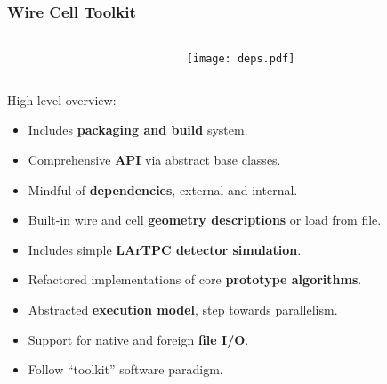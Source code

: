 \documentclass[xcolor=dvipsnames]{beamer}
\begin{document}
\begin{frame}
  \frametitle{Wire Cell Toolkit}
  \begin{columns}
    \begin{column}{0.65\paperwidth}
    \end{column}
    \begin{column}{0.35\paperwidth}
      \vspace{-20mm}
      \texttt{[image: deps.pdf]}      
    \end{column}
  \end{columns}

  \vspace{-15mm}

  High level overview:
  \begin{itemize}
  \item Includes \textbf{packaging and build} system.
  \item Comprehensive \textbf{API} via abstract base classes.
  \item Mindful of \textbf{dependencies}, external and internal.
  \item Built-in wire and cell \textbf{geometry descriptions} or load from file.
  \item Includes simple \textbf{LArTPC detector simulation}.
  \item Refactored implementations of core \textbf{prototype algorithms}.
  \item Abstracted \textbf{execution model}, step towards parallelism.
  \item Support for native and foreign \textbf{file I/O}.
  \item Follow ``toolkit'' software paradigm.
  \end{itemize}

\end{frame}
\end{document}
